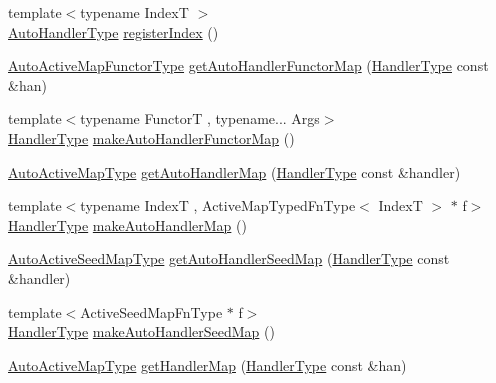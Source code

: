 \begin{DoxyCompactItemize}
\item 
{\footnotesize template$<$typename IndexT $>$ }\\\hyperlink{namespacevt_1_1auto__registry_ae295e18699146815bb7d7674594d95d7}{Auto\+Handler\+Type} \hyperlink{namespacevt_1_1auto__registry_a234dcadb35d20ff9a4d0e2464680aa36}{register\+Index} ()
\item 
\hyperlink{namespacevt_1_1auto__registry_ab095554f67e143f84fe337bd85affde5}{Auto\+Active\+Map\+Functor\+Type} \hyperlink{namespacevt_1_1auto__registry_a953643675f2bd525b99c0702753b1367}{get\+Auto\+Handler\+Functor\+Map} (\hyperlink{namespacevt_af64846b57dfcaf104da3ef6967917573}{Handler\+Type} const \&han)
\item 
{\footnotesize template$<$typename FunctorT , typename... Args$>$ }\\\hyperlink{namespacevt_af64846b57dfcaf104da3ef6967917573}{Handler\+Type} \hyperlink{namespacevt_1_1auto__registry_a64989cf40ed8fc5266f9eb67607f4842}{make\+Auto\+Handler\+Functor\+Map} ()
\item 
\hyperlink{namespacevt_1_1auto__registry_a03898a246ff1a8ce8ee4071a0391b386}{Auto\+Active\+Map\+Type} \hyperlink{namespacevt_1_1auto__registry_a5506d0d3d541558f304cc62fbd36c7ce}{get\+Auto\+Handler\+Map} (\hyperlink{namespacevt_af64846b57dfcaf104da3ef6967917573}{Handler\+Type} const \&handler)
\item 
{\footnotesize template$<$typename IndexT , Active\+Map\+Typed\+Fn\+Type$<$ Index\+T $>$ $\ast$ f$>$ }\\\hyperlink{namespacevt_af64846b57dfcaf104da3ef6967917573}{Handler\+Type} \hyperlink{namespacevt_1_1auto__registry_a07288f368e86daba0e0045a8e7bfda92}{make\+Auto\+Handler\+Map} ()
\item 
\hyperlink{namespacevt_1_1auto__registry_a9b5f3bdf0a9a503806cfd4f2747c82f6}{Auto\+Active\+Seed\+Map\+Type} \hyperlink{namespacevt_1_1auto__registry_a9cc26c2d063427e42efb4b08aec5b237}{get\+Auto\+Handler\+Seed\+Map} (\hyperlink{namespacevt_af64846b57dfcaf104da3ef6967917573}{Handler\+Type} const \&handler)
\item 
{\footnotesize template$<$Active\+Seed\+Map\+Fn\+Type $\ast$ f$>$ }\\\hyperlink{namespacevt_af64846b57dfcaf104da3ef6967917573}{Handler\+Type} \hyperlink{namespacevt_1_1auto__registry_a566748acf9e0867edadcf5e556b01b00}{make\+Auto\+Handler\+Seed\+Map} ()
\item 
\hyperlink{namespacevt_1_1auto__registry_a03898a246ff1a8ce8ee4071a0391b386}{Auto\+Active\+Map\+Type} \hyperlink{namespacevt_1_1auto__registry_afd33d520084dd18da74f96012ca084b0}{get\+Handler\+Map} (\hyperlink{namespacevt_af64846b57dfcaf104da3ef6967917573}{Handler\+Type} const \&han)

\end{DoxyCompactItemize}
